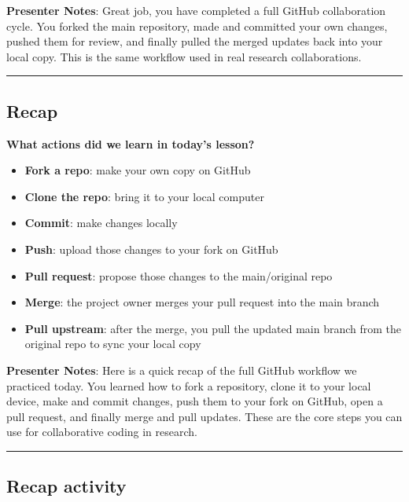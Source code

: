 \documentclass[
  letterpaper,
  DIV=11,
  numbers=noendperiod]{scrartcl}
\providecommand{\tightlist}{%
  \setlength{\itemsep}{0pt}\setlength{\parskip}{0pt}}
\begin{document}
\textbf{Presenter Notes}: Great job, you have completed a full GitHub
collaboration cycle. You forked the main repository, made and committed
your own changes, pushed them for review, and finally pulled the merged
updates back into your local copy. This is the same workflow used in
real research collaborations.

\begin{center}\rule{0.5\linewidth}{0.5pt}\end{center}

\subsection{Recap}\label{recap}

\textbf{What actions did we learn in today's lesson?}

\begin{itemize}
\tightlist
\item
  \textbf{Fork a repo}: make your own copy on GitHub
\item
  \textbf{Clone the repo}: bring it to your local computer
\item
  \textbf{Commit}: make changes locally
\item
  \textbf{Push}: upload those changes to your fork on GitHub
\item
  \textbf{Pull request}: propose those changes to the main/original repo
\item
  \textbf{Merge}: the project owner merges your pull request into the
  main branch
\item
  \textbf{Pull upstream}: after the merge, you pull the updated main
  branch from the original repo to sync your local copy
\end{itemize}

\textbf{Presenter Notes}: Here is a quick recap of the full GitHub
workflow we practiced today. You learned how to fork a repository, clone
it to your local device, make and commit changes, push them to your fork
on GitHub, open a pull request, and finally merge and pull updates.
These are the core steps you can use for collaborative coding in
research.

\begin{center}\rule{0.5\linewidth}{0.5pt}\end{center}

\subsection{Recap activity}\label{recap-activity}
\end{document}
